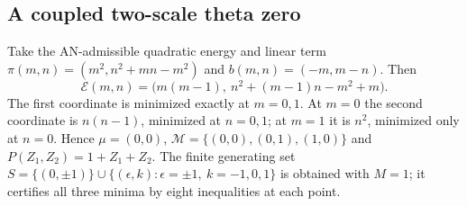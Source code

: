 \documentclass[11pt,letterpaper]{article}
\theoremstyle{definition}
\newcommand{\cE}{\mathcal E}
\newcommand{\cM}{\mathcal M}
\begin{document}
\subsection{A coupled two-scale theta zero}\label{tate:theta:sec:coupled}

Take the AN-admissible quadratic energy and linear term
$\pi(m,n)=(m^2,n^2+mn-m^2)$ and $b(m,n)=(-m,m-n)$. Then
\begin{equation}
 \cE(m,n)=\bigl(m(m-1),\ n^2+(m-1)n-m^2+m\bigr).\label{tate:theta:eq:coupledenergy}
\end{equation}
The first coordinate is minimized exactly at $m=0,1$. At $m=0$ the second
coordinate is $n(n-1)$, minimized at $n=0,1$; at $m=1$ it is $n^2$,
minimized only at $n=0$. Hence $\mu=(0,0)$,
$\cM=\{(0,0),(0,1),(1,0)\}$ and $P(Z_1,Z_2)=1+Z_1+Z_2$. The finite
generating set $S=\{(0,\pm1)\}\cup\{(\epsilon,k):\epsilon=\pm1,\ k=-1,0,1\}$
is obtained with $M=1$; it certifies all three minima by eight inequalities
at each point.
\end{document}
